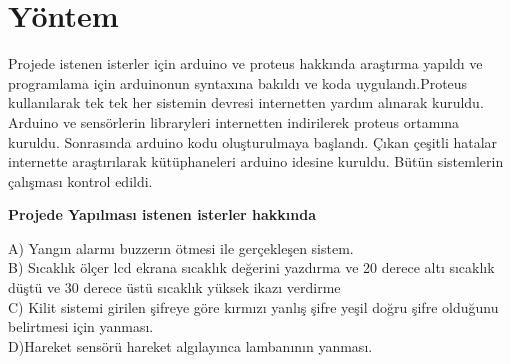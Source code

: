\documentclass[conference]{IEEEtran}
\begin{document}
\section{Yöntem}
Projede istenen isterler için arduino ve proteus hakkında araştırma yapıldı ve programlama için arduinonun syntaxına bakıldı ve koda uygulandı.Proteus kullanılarak tek tek her sistemin devresi internetten yardım alınarak kuruldu.
Arduino ve sensörlerin libraryleri internetten indirilerek proteus ortamına kuruldu. Sonrasında arduino kodu oluşturulmaya başlandı. Çıkan çeşitli hatalar internette araştırılarak kütüphaneleri arduino idesine kuruldu. Bütün sistemlerin çalışması kontrol edildi.\\
\begin{flushleft}
\textbf{Projede Yapılması istenen isterler hakkında\\}	
\end{flushleft}

A) Yangın alarmı buzzerın ötmesi ile gerçekleşen sistem.\\
B) Sıcaklık ölçer lcd ekrana sıcaklık değerini yazdırma ve 20 derece altı sıcaklık düştü ve 30 derece üstü sıcaklık yüksek ikazı verdirme \\
C) Kilit sistemi girilen şifreye göre kırmızı yanlış şifre yeşil doğru şifre olduğunu belirtmesi için yanması.\\
D)Hareket sensörü hareket algılayınca lambanının yanması.\\
\\
\end{document}

